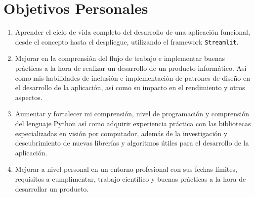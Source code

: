 \section {Objetivos Personales}
\begin{enumerate}
\item Aprender el ciclo de vida completo del desarrollo de una aplicación funcional, desde el concepto hasta el despliegue, utilizando el framework \verb|Streamlit|.
\item  Mejorar en la comprensión del flujo de trabajo  e implementar buenas prácticas a la hora de realizar un desarrollo de un producto informático. Así como  mis habilidades de inclusión e implementación de patrones de diseño en el desarrollo de la aplicación, así como su impacto en el rendimiento y otros aspectos.
\item Aumentar y fortalecer mi comprensión, nivel de programación y comprensión del lenguaje Python así como adquirir experiencia práctica con las bibliotecas especializadas en visión por computador, además de la investigación y descubrimiento de nuevas librerías y algoritmos útiles para el desarrollo de la aplicación.
\item Mejorar a nivel personal en un entorno profesional con sus fechas límites, requisitos a cumplimentar, trabajo científico y buenas prácticas a la hora de desarrollar un producto.

\end{enumerate}
